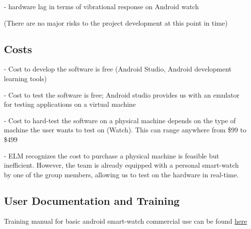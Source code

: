 \documentclass[12pt, titlepage]{article}
\begin{document}
\noindent - hardware lag in terms of vibrational response on Android watch

\noindent (There are no major risks to the project development at this point in time)

\subsection{Costs}

- Cost to develop the software is free (Android Studio, Android development learning tools)

\noindent - Cost to test the software is free; Android studio provides us with an emulator for testing applications on a virtual machine

\noindent - Cost to hard-test the software on a physical machine depends on the type of machine the user wants to test on (Watch). This can range anywhere from \$99 to \$499

\noindent - ELM recognizes the cost to purchase a physical machine is feasible but inefficient. However, the team is already equipped with a personal smart-watch by one of the group members, allowing us to test on the hardware in real-time.

\subsection{User Documentation and Training}

Training manual for basic android smart-watch commercial use can be found \href{https://www.wareable.com/android-wear/android-wear-super-guide-the-missing-manual-001}{here} 




\end{document}
